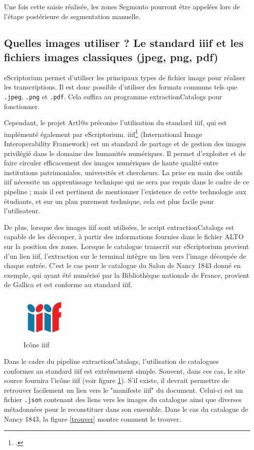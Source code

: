 \documentclass[a4paper,12pt,twoside]{book}
\begin{document}
Une fois cette saisie réalisée, les zones Segmonto pourront être appelées lors de l'étape postérieure de segmentation manuelle. 


\subsection{Quelles images utiliser ? Le standard iiif et les fichiers images classiques (jpeg, png, pdf)}

eScriptorium permet d'utiliser les principaux types de fichier image pour réaliser les transcriptions. Il est donc possible d'utiliser des formats communs tels que \texttt{.jpeg}, \texttt{.png} et \texttt{.pdf}. Cela suffira au programme extractionCatalogs pour fonctionner.

Cependant, le projet Artl@s préconise l'utilisation du standard iiif, qui est implémenté également par eScriptorium. iiif\footcite{IIIfInternationalImage} (International Image Interoperability Framework) est un standard de partage et de gestion des images privilégié dans le domaine des humanités numériques. Il permet d'exploiter et de faire circuler efficacement des images numériques de haute qualité entre institutions patrimoniales, universités et chercheurs. La prise en main des outils iiif nécessite un apprentissage technique qui ne sera pas requis dans le cadre de ce pipeline ; mais il est pertinent de mentionner l'existence de cette technologie aux étudiants, et sur un plan purement technique, cela est plus facile pour l'utilisateur. 

De plus, lorsque des images iiif sont utilisées, le script extractionCatalogs est capable de les découper, à partir des informations fournies dans le fichier ALTO sur la position des zones. Lorsque le catalogue transcrit sur eScriptorium provient d'un lien iiif, l'extraction sur le terminal intègre un lien vers l'image découpée de chaque entrée. C'est le cas pour le catalogue du Salon de Nancy 1843 donné en exemple, qui ayant été numérisé par la Bibliothèque nationale de France, provient de Gallica et est conforme au standard iiif. 

\begin{figure}
	\centering
	\includegraphics[width=0.20\textwidth]{iiif}
	\caption{Icône iiif}
	\label{iiif}
\end{figure}
Dans le cadre du pipeline extractionCatalogs, l'utilisation de catalogues conformes au standard iiif est extrêmement simple. Souvent, dans ces cas, le site source fournira l'icône iiif (voir figure \ref{iiif}). S'il existe, il devrait permettre de retrouver facilement un lien vers le "manifeste iiif" du document. Celui-ci est un fichier \texttt{.json} contenant des liens vers les images du catalogue ainsi que diverses métadonnées pour le reconstituer dans son ensemble. Dans le cas du catalogue de Nancy 1843, la figure \ref{trouver} montre comment le trouver.
\end{document}
